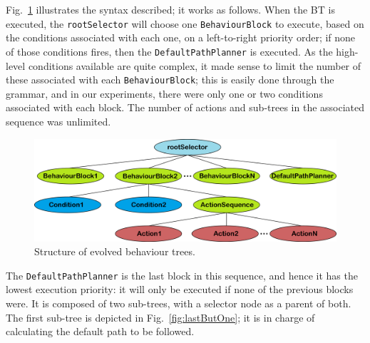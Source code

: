 \documentclass[conference]{IEEEtran}
\begin{document}
Fig.~\ref{fig:defaultTree} illustrates the syntax described; it works as follows.
When the BT is executed, the \texttt{rootSelector} will
choose one \texttt{BehaviourBlock} to execute, based on the conditions
associated with each one, on a left-to-right priority order; if none of those
conditions fires, then the \texttt{DefaultPathPlanner} is executed.  As the
high-level conditions available are quite complex, it made sense to limit the
number of these associated with each \texttt{BehaviourBlock}; this is easily
done through the grammar, and in our experiments, there were only one or two
conditions associated with each block. The number of actions and sub-trees in
the associated sequence was unlimited.

\begin{figure}[ht]
	\begin{center}
	\includegraphics[scale=0.07]{images/defaultTreeImg}
	\caption{Structure of evolved behaviour trees.}
	\label{fig:defaultTree}
	\end{center}
\end{figure}

The \texttt{DefaultPathPlanner} is the last block in this sequence, and hence it
has the lowest execution priority: it will only be executed if none of the
previous blocks were. It is composed of two sub-trees, with a selector
node as a parent of both. 
The first sub-tree is depicted in Fig.~\ref{fig:lastButOne};
it is in charge of calculating the default path to be followed. 

\end{document}

